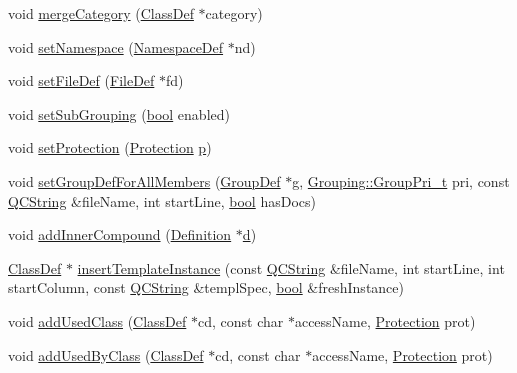\begin{DoxyCompactItemize}
\item 
void \hyperlink{class_class_def_a67f89df2361269ef583f33b2ee087a2b}{merge\+Category} (\hyperlink{class_class_def}{Class\+Def} $\ast$category)
\item 
void \hyperlink{class_class_def_a03f05923f7ecbe5199e0f39d05c83c57}{set\+Namespace} (\hyperlink{class_namespace_def}{Namespace\+Def} $\ast$nd)
\item 
void \hyperlink{class_class_def_a814a32af1fe1d6d901dde4eef0ccfcdd}{set\+File\+Def} (\hyperlink{class_file_def}{File\+Def} $\ast$fd)
\item 
void \hyperlink{class_class_def_aeed0fd23615a98b0cbcc1faf5bcab6bd}{set\+Sub\+Grouping} (\hyperlink{qglobal_8h_a1062901a7428fdd9c7f180f5e01ea056}{bool} enabled)
\item 
void \hyperlink{class_class_def_afdba759f6a8bc7816b1bef2cc08c2c88}{set\+Protection} (\hyperlink{types_8h_a90e352184df58cd09455fe9996cd4ded}{Protection} \hyperlink{060__command__switch_8tcl_a15229b450f26d8fa1c10bea4f3279f4d}{p})
\item 
void \hyperlink{class_class_def_a83670f6f0dec52283e80605190dec6af}{set\+Group\+Def\+For\+All\+Members} (\hyperlink{class_group_def}{Group\+Def} $\ast$\hyperlink{060__command__switch_8tcl_af08b4b5bfa9edf0b0a7dee1c2b2c29e0}{g}, \hyperlink{struct_grouping_a9f0ec5ab376b083ebe3274ea79fd2d70}{Grouping\+::\+Group\+Pri\+\_\+t} pri, const \hyperlink{class_q_c_string}{Q\+C\+String} \&file\+Name, int start\+Line, \hyperlink{qglobal_8h_a1062901a7428fdd9c7f180f5e01ea056}{bool} has\+Docs)
\item 
void \hyperlink{class_class_def_a7b5a9498ef2334cb960e5d799942cb73}{add\+Inner\+Compound} (\hyperlink{class_definition}{Definition} $\ast$\hyperlink{060__command__switch_8tcl_af43f4b1f0064a33b2d662af9f06d3a00}{d})
\item 
\hyperlink{class_class_def}{Class\+Def} $\ast$ \hyperlink{class_class_def_adcca2200b60cb35868a5f245011197c0}{insert\+Template\+Instance} (const \hyperlink{class_q_c_string}{Q\+C\+String} \&file\+Name, int start\+Line, int start\+Column, const \hyperlink{class_q_c_string}{Q\+C\+String} \&templ\+Spec, \hyperlink{qglobal_8h_a1062901a7428fdd9c7f180f5e01ea056}{bool} \&fresh\+Instance)
\item 
void \hyperlink{class_class_def_a87934df4169779d1cede8616c88e46c8}{add\+Used\+Class} (\hyperlink{class_class_def}{Class\+Def} $\ast$cd, const char $\ast$access\+Name, \hyperlink{types_8h_a90e352184df58cd09455fe9996cd4ded}{Protection} prot)
\item 
void \hyperlink{class_class_def_ab9d0b0dea11daab4844e904e655c3641}{add\+Used\+By\+Class} (\hyperlink{class_class_def}{Class\+Def} $\ast$cd, const char $\ast$access\+Name, \hyperlink{types_8h_a90e352184df58cd09455fe9996cd4ded}{Protection} prot)

\end{DoxyCompactItemize}
